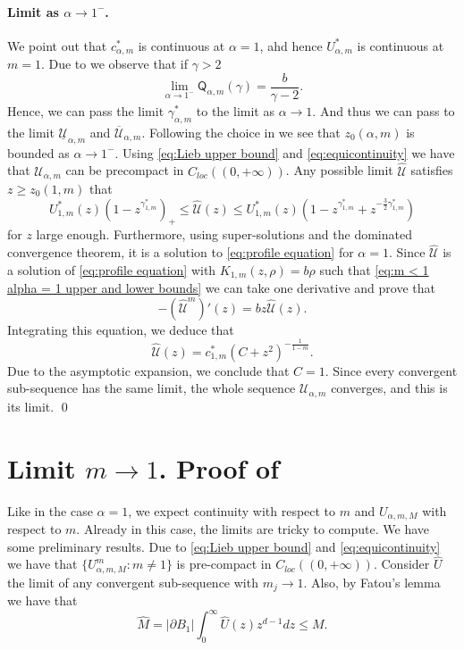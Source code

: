 \documentclass[a4paper]{article}
\theoremstyle{definition}
\begin{document}
\paragraph{Limit as $\alpha \to 1^-$.} We point out that $c^*_{\alpha,m}$ is continuous at $\alpha = 1$, ahd hence $U^*_{\alpha,m}$ is continuous at $m = 1$.
Due to  we observe that if $\gamma > 2$
\begin{equation*}
\lim_{\alpha \to 1^-}\mathsf Q_{\alpha,m} (\gamma) = \frac{b}{\gamma - 2}.
\end{equation*}
Hence, we can pass the limit $\gamma^*_{\alpha,m}$ to the limit as $\alpha \to 1$. And thus we can pass to the limit $\underline{\mathcal U}_{\alpha,m}$ and $\overline{\mathcal U}_{\alpha,m}$. Following the choice in  we see that $z_0(\alpha,m)$ is bounded as $\alpha \to 1^-$.
Using \eqref{eq:Lieb upper bound} and \eqref{eq:equicontinuity} we have that $\mathcal U_{\alpha,m}$ can be precompact in $C_{loc}((0,+\infty))$. Any possible limit $\widehat {\mathcal U}$ satisfies $z \ge z_0(1,m)$ that
\begin{equation}
\label{eq:m < 1 alpha = 1 upper and lower bounds}
U^*_{1, m} (z) (1 - z^{\gamma^*_{1,m}})_+ \le \widehat {\mathcal U} (z) \le U^*_{1, m} (z) (1 - z^{\gamma^*_{1,m}} + z^{-\frac 3 2 \gamma^*_{1,m}})
\end{equation}
for $z$ large enough.
Furthermore, using super-solutions and the dominated convergence theorem, it is a solution to \eqref{eq:profile equation} for $\alpha = 1$. Since $\widehat{\mathcal U}$ is a solution of \eqref{eq:profile equation} with $K_{1,m}(z,\rho) = b \rho$ such that \eqref{eq:m < 1 alpha = 1 upper and lower bounds} we can take one derivative and prove that
\begin{equation*}
-(\widehat{\mathcal U}^m)'(z) = b z \widehat{\mathcal U}(z).
\end{equation*}
Integrating this equation, we deduce that
\begin{equation*}
\widehat{\mathcal U}(z) = c^*_{1,m}(C + z^2)^{-\frac{1}{1-m}}.
\end{equation*}
Due to the asymptotic expansion, we conclude that $C = 1$. Since every convergent sub-sequence has the same limit, the whole sequence $\mathcal U_{\alpha,m}$ converges, and this is its limit.
\qed

\section{Limit $m \to 1$. Proof of }
Like in the case $\alpha = 1$, we expect continuity with respect to $m$ and $U_{\alpha,m,M}$ with respect to $m$. Already in this case, the limits are tricky to compute. We have some preliminary results.
Due to \eqref{eq:Lieb upper bound}  and \eqref{eq:equicontinuity} we have that $\{ U_{\alpha,m,M}^m : m \ne 1 \}$ is pre-compact in $C_{loc}((0,+\infty))$.
Consider $\widehat U$ the limit of any convergent sub-sequence with $m_j \to 1$.
Also, by Fatou's lemma we have that
\begin{equation*}
\widehat M = |\partial B_1| \int_0^\infty \widehat U(z) z^{d-1} dz \le M .
\end{equation*}
\end{document}
